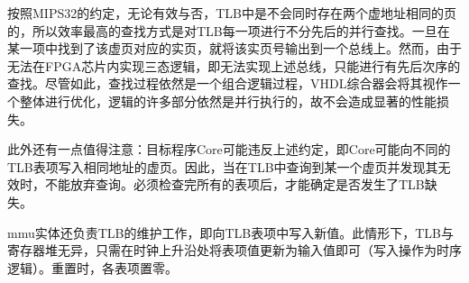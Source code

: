 \documentclass{article}
\begin{document}
\begin{spacing}{1.4}
按照MIPS32的约定，无论有效与否，TLB中是不会同时存在两个虚地址相同的页的，所以效率最高的查找方式是对TLB每一项进行不分先后的并行查找。一旦在某一项中找到了该虚页对应的实页，就将该实页号输出到一个总线上。然而，由于无法在FPGA芯片内实现三态逻辑，即无法实现上述总线，只能进行有先后次序的查找。尽管如此，查找过程依然是一个组合逻辑过程，VHDL综合器会将其视作一个整体进行优化，逻辑的许多部分依然是并行执行的，故不会造成显著的性能损失。

此外还有一点值得注意：目标程序\textmu Core可能违反上述约定，即\textmu Core可能向不同的TLB表项写入相同地址的虚页。因此，当在TLB中查询到某一个虚页并发现其无效时，不能放弃查询。必须检查完所有的表项后，才能确定是否发生了TLB缺失。

mmu实体还负责TLB的维护工作，即向TLB表项中写入新值。此情形下，TLB与寄存器堆无异，只需在时钟上升沿处将表项值更新为输入值即可（写入操作为时序逻辑）。重置时，各表项置零。


\end{spacing}
\end{document}
